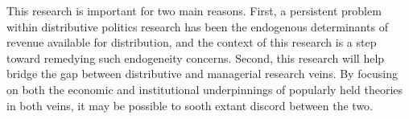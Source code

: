 \documentclass[12pt,a4paper]{article}
\begin{document}
\par This research is important for two main reasons. First, a persistent problem within distributive politics research has been the endogenous determinants of revenue available for distribution, and the context of this research is a step toward remedying such endogeneity concerns. Second, this research will help bridge the gap between distributive and managerial research veins. By focusing on both the economic and institutional underpinnings of popularly held theories in both veins, it may be possible to sooth extant discord between the two.
\end{document}

